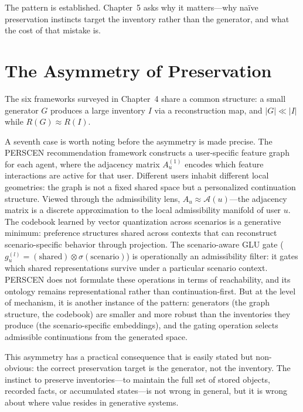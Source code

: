 \documentclass[12pt, oneside]{book}
\theoremstyle{flyxion}
\theoremstyle{definition}
\begin{document}
The pattern is established. Chapter~5 asks why it matters---why
naïve preservation instincts target the inventory rather than the
generator, and what the cost of that mistake is.

\chapter{The Asymmetry of Preservation}

The six frameworks surveyed in Chapter~4 share a common structure:
a small generator $G$ produces a large inventory $I$ via a
reconstruction map, and $|G| \ll |I|$ while $R(G) \approx R(I)$.

A seventh case is worth noting before the asymmetry is made precise.
The PERSCEN recommendation framework \citep{Du2025} constructs a
user-specific feature graph for each agent, where the adjacency
matrix $A_u^{(1)}$ encodes which feature interactions are active for
that user. Different users inhabit different local geometries: the
graph is not a fixed shared space but a personalized continuation
structure. Viewed through the admissibility lens, $A_u \approx
\mathcal{A}(u)$---the adjacency matrix is a discrete approximation to
the local admissibility manifold of user $u$. The codebook learned by
vector quantization across scenarios is a generative minimum:
preference structures shared across contexts that can reconstruct
scenario-specific behavior through projection. The scenario-aware
GLU gate ($g_u^{(l)} = (\text{shared}) \otimes \sigma(\text{scenario})$)
is operationally an admissibility filter: it gates which shared
representations survive under a particular scenario context. PERSCEN
does not formulate these operations in terms of reachability, and its
ontology remains representational rather than continuation-first. But
at the level of mechanism, it is another instance of the pattern:
generators (the graph structure, the codebook) are smaller and more
robust than the inventories they produce (the scenario-specific
embeddings), and the gating operation selects admissible continuations
from the generated space.

This asymmetry has a practical consequence that is easily stated
but non-obvious: the correct preservation target is the generator,
not the inventory. The instinct to preserve inventories---to maintain
the full set of stored objects, recorded facts, or accumulated
states---is not wrong in general, but it is wrong about where
value resides in generative systems.
\end{document}
